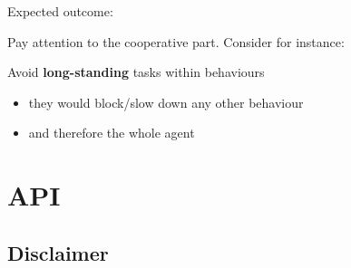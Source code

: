 \documentclass{beamer}\mode<presentation>{\usetheme{AMSCesenaPurpleAndGold}}
\begin{document}
\begin{frame}[allowframebreaks]
    \framebreak

    Expected outcome:
    

    \framebreak

    Pay attention to the \alert{cooperative} part. Consider for instance:
    

    \bigskip

    \begin{alertblock}{Avoid \textbf{long-standing} tasks within behaviours}
        \begin{itemize}
            \item they would block/slow down any other behaviour
            \item and therefore the whole agent
        \end{itemize}
    \end{alertblock}

\end{frame}

\section{API}

\subsection{Disclaimer}
\end{document}

